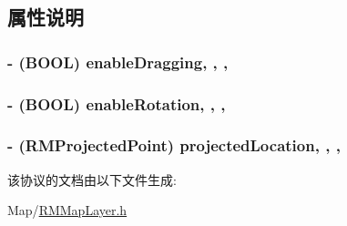 \subsection{属性说明}
\hypertarget{protocol_r_m_moving_map_layer-p_a5ee0b003170b8e66e2ac6bf4ea8820be}{
\subsubsection[{enable\-Dragging}]{\setlength{\rightskip}{0pt plus 5cm}-\/ (B\-O\-O\-L) enable\-Dragging\hspace{0.3cm}{\ttfamily [read]}, {\ttfamily [write]}, {\ttfamily [atomic]}, {\ttfamily [assign]}}}\label{protocol_r_m_moving_map_layer-p_a5ee0b003170b8e66e2ac6bf4ea8820be}
\hypertarget{protocol_r_m_moving_map_layer-p_ada91bd4f9f5507b894d1534c01727ee9}{
\subsubsection[{enable\-Rotation}]{\setlength{\rightskip}{0pt plus 5cm}-\/ (B\-O\-O\-L) enable\-Rotation\hspace{0.3cm}{\ttfamily [read]}, {\ttfamily [write]}, {\ttfamily [atomic]}, {\ttfamily [assign]}}}\label{protocol_r_m_moving_map_layer-p_ada91bd4f9f5507b894d1534c01727ee9}
\hypertarget{protocol_r_m_moving_map_layer-p_a4a6ac55816966cfafc82a6e5114d2cac}{
\subsubsection[{projected\-Location}]{\setlength{\rightskip}{0pt plus 5cm}-\/ ({\bf R\-M\-Projected\-Point}) projected\-Location\hspace{0.3cm}{\ttfamily [read]}, {\ttfamily [write]}, {\ttfamily [nonatomic]}, {\ttfamily [assign]}}}\label{protocol_r_m_moving_map_layer-p_a4a6ac55816966cfafc82a6e5114d2cac}


该协议的文档由以下文件生成\-:\begin{DoxyCompactItemize}
\item 
Map/\hyperlink{_r_m_map_layer_8h}{R\-M\-Map\-Layer.\-h}\end{DoxyCompactItemize}
